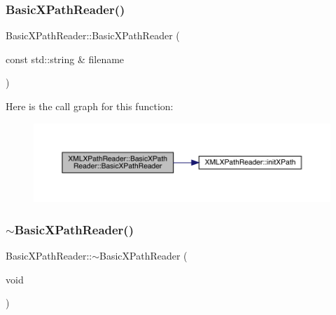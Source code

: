 \subsubsection{\texorpdfstring{BasicXPathReader()}{BasicXPathReader()}\hspace{0.1cm}{\footnotesize\ttfamily [3/8]}}
{\footnotesize\ttfamily Basic\+X\+Path\+Reader\+::\+Basic\+X\+Path\+Reader (\begin{DoxyParamCaption}\item[{const std\+::string \&}]{filename }\end{DoxyParamCaption})}

Here is the call graph for this function\+:\nopagebreak
\begin{figure}[H]
\begin{center}
\leavevmode
\includegraphics[width=350pt]{d6/dbf/classXMLXPathReader_1_1BasicXPathReader_ad8df69bf440f9a9602fcba52782489f0_cgraph}
\end{center}
\end{figure}
\mbox{\label{classXMLXPathReader_1_1BasicXPathReader_ad741466e0f48892e36f19472db5abf52}} 
\subsubsection{\texorpdfstring{$\sim$BasicXPathReader()}{~BasicXPathReader()}\hspace{0.1cm}{\footnotesize\ttfamily [1/2]}}
{\footnotesize\ttfamily Basic\+X\+Path\+Reader\+::$\sim$\+Basic\+X\+Path\+Reader (\begin{DoxyParamCaption}\item[{void}]{ }\end{DoxyParamCaption})}

